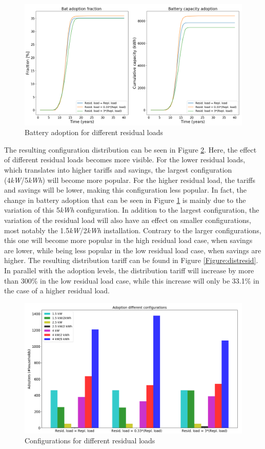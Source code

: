 \begin{figure}[h!]
\centering
\includegraphics[width=12cm]{ModelAnalysis/BatResid.png}
\caption{Battery adoption for different residual loads}
\label{Figure:batresid}
\end{figure}
\noindent
The resulting configuration distribution can be seen in Figure \ref{Figure:configresid}. Here, the effect of different residual loads becomes more visible. For the lower residual loads, which translates into higher tariffs and savings, the largest configuration (4\textit{kW}/5\textit{kWh}) will become more popular. For the higher residual load, the tariffs and savings will be lower, making this configuration less popular. In fact, the change in battery adoption that can be seen in Figure \ref{Figure:batresid} is mainly due to the variation of this 5\textit{kWh} configuration.
In addition to the largest configuration, the variation of the residual load will also have an effect on smaller configurations, most notably the 1.5\textit{kW}/2\textit{kWh} installation. Contrary to the larger configurations, this one will become more popular in the high residual load case, when savings are lower, while being less popular in the low residual load case, when savings are higher. The resulting distribution tariff can be found in Figure \ref{Figure:distresid}. In parallel with the adoption levels, the distribution tariff will increase by more than 300\% in the low residual load case, while this increase will only be 33.1\% in the case of a higher residual load. 
\begin{figure}[h!]
\centering
\includegraphics[width=12cm]{ModelAnalysis/ConfigResid.png}
\caption{Configurations for different residual loads}
\label{Figure:configresid}
\end{figure}

